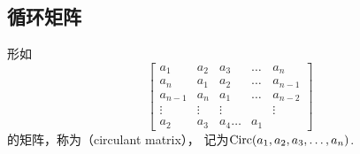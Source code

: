 \subsection{循环矩阵}
形如\begin{equation*}
	\begin{bmatrix}
		a_1 & a_2 & a_3 & \dots & a_n \\
		a_n & a_1 & a_2 & \dots & a_{n-1} \\
		a_{n-1} & a_n & a_1 & \dots & a_{n-2} \\
		\vdots & \vdots & \vdots & & \vdots \\
		a_2 & a_3 & a_4 \dots & a_1
	\end{bmatrix}
\end{equation*}
的矩阵，称为（circulant matrix），
记为\(\operatorname{Circ}(a_1,a_2,a_3,\dotsc,a_n)\).

